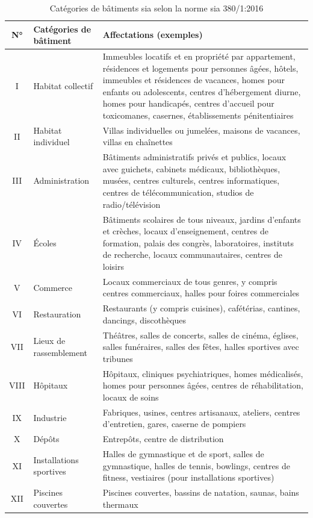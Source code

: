 \begin{table}[H]
    \centering
    \begin{tabular}{@{}clp{}@{}}
    \toprule
    \textbf{N°} & \textbf{Catégories de bâtiment} & \textbf{Affectations (exemples)} \\
    \midrule
    I & Habitat collectif & Immeubles locatifs et en propriété par appartement, résidences et logements pour personnes âgées, hôtels, immeubles et résidences de vacances, homes pour enfants ou adolescents, centres d'hébergement diurne, homes pour handicapés, centres d'accueil pour toxicomanes, casernes, établissements pénitentiaires \\
    II & Habitat individuel & Villas individuelles ou jumelées, maisons de vacances, villas en chaînettes \\
    III & Administration & Bâtiments administratifs privés et publics, locaux avec guichets, cabinets médicaux, bibliothèques, musées, centres culturels, centres informatiques, centres de télécommunication, studios de radio/télévision \\
    IV & Écoles & Bâtiments scolaires de tous niveaux, jardins d'enfants et crèches, locaux d'enseignement, centres de formation, palais des congrès, laboratoires, instituts de recherche, locaux communautaires, centres de loisirs \\
    V & Commerce & Locaux commerciaux de tous genres, y compris centres commerciaux, halles pour foires commerciales \\
    VI & Restauration & Restaurants (y compris cuisines), cafétérias, cantines, dancings, discothèques \\
    VII & Lieux de rassemblement & Théâtres, salles de concerts, salles de cinéma, églises, salles funéraires, salles des fêtes, halles sportives avec tribunes \\
    VIII & Hôpitaux & Hôpitaux, cliniques psychiatriques, homes médicalisés, homes pour personnes âgées, centres de réhabilitation, locaux de soins \\
    IX & Industrie & Fabriques, usines, centres artisanaux, ateliers, centres d'entretien, gares, caserne de pompiers \\
    X & Dépôts & Entrepôts, centre de distribution \\
    XI & Installations sportives & Halles de gymnastique et de sport, salles de gymnastique, halles de tennis, bowlings, centres de fitness, vestiaires (pour installations sportives) \\
    XII & Piscines couvertes & Piscines couvertes, bassins de natation, saunas, bains thermaux \\
    \bottomrule
    \end{tabular}
    \caption{Catégories de bâtiments \gls{sia} selon la norme \gls{sia} 380/1:2016 \cite{sia_sia-shop_nodate}}
    \label{tab:categories_batiments_sia_380_1}
\end{table}

